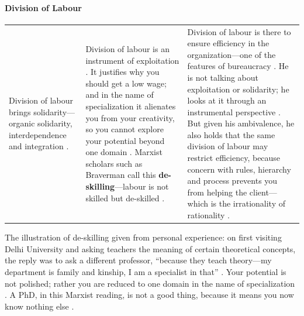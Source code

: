 \paragraph{Division of Labour}
\vspace{6pt}
\noindent
\begin{tabularx}{\textwidth}{>{\hsize}Y >{\hsize}Y >{\hsize}Y}
\toprule
{}
 &  &  \\
\midrule
Division of labour brings solidarity---organic solidarity, interdependence and integration . & Division of labour is an instrument of exploitation . It justifies why you should get a low wage; and in the name of specialization it alienates you from your creativity, so you cannot explore your potential beyond one domain . Marxist scholars such as Braverman call this \textbf{de-skilling}---labour is not skilled but de-skilled . & Division of labour is there to ensure efficiency in the organization---one of the features of bureaucracy . He is not talking about exploitation or solidarity; he looks at it through an instrumental perspective . But given his ambivalence, he also holds that the same division of labour may restrict efficiency, because concern with rules, hierarchy and process prevents you from helping the client---which is the irrationality of rationality . \\
\bottomrule
\end{tabularx}
\vspace{6pt}

\begin{ExampleBox}
The illustration of de-skilling given from personal experience: on first visiting Delhi University and asking teachers the meaning of certain theoretical concepts, the reply was to ask a different professor, ``because they teach theory---my department is family and kinship, I am a specialist in that'' .
Your potential is not polished; rather you are reduced to one domain in the name of specialization . A PhD, in this Marxist reading, is not a good thing, because it means you now know nothing else .
\end{ExampleBox}

